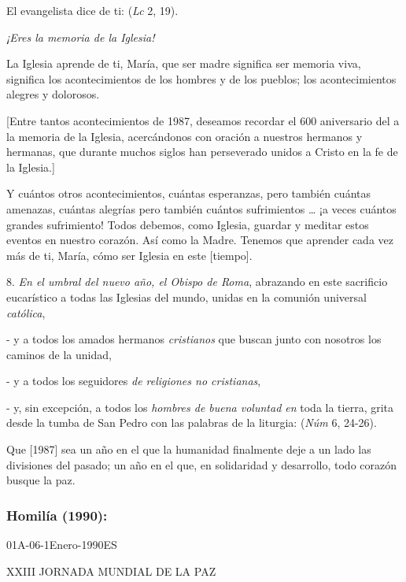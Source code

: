 \begin{body}
	El evangelista dice de ti:  (\emph{Lc} 2, 19).

	\emph{¡Eres la memoria de la Iglesia!}

	La Iglesia aprende de ti, María, que ser madre significa ser memoria viva, significa  los acontecimientos de los hombres y de los pueblos; los acontecimientos alegres y dolorosos.

	{[}Entre tantos acontecimientos de 1987, deseamos recordar el 600 aniversario del  a la memoria de la Iglesia, acercándonos con oración a nuestros hermanos y hermanas, que durante muchos siglos han perseverado unidos a Cristo en la fe de la Iglesia.{]}

	Y cuántos otros acontecimientos, cuántas esperanzas, pero también cuántas amenazas, cuántas alegrías pero también cuántos sufrimientos \ldots{} ¡a veces cuántos grandes sufrimiento! Todos debemos, como Iglesia, guardar y meditar estos eventos en nuestro corazón. Así como la Madre. Tenemos que aprender cada vez más de ti, María, cómo ser Iglesia en este {[}tiempo{]}.

	8. \emph{En el umbral del nuevo año, el Obispo de Roma}, abrazando en este sacrificio eucarístico a todas las Iglesias del mundo, unidas en la comunión universal \emph{católica},

	- y a todos los amados hermanos \emph{cristianos} que buscan junto con nosotros los caminos de la unidad,

	- y a todos los seguidores \emph{de religiones no cristianas},

	- y, sin excepción, a todos los \emph{hombres de buena voluntad en} toda la tierra, grita desde la tumba de San Pedro con las palabras de la liturgia:  (\emph{Núm} 6, 24-26).

	Que {[}1987{]} sea un año en el que la humanidad finalmente deje a un lado las divisiones del pasado; un año en el que, en solidaridad y desarrollo, todo corazón busque la paz.

	\subsubsection{Homilía (1990):} 01A-06-1Enero-1990ES

	{XXIII JORNADA 	MUNDIAL DE LA PAZ}


\end{body}
